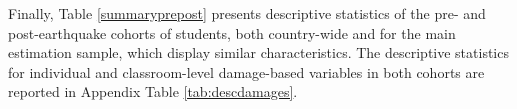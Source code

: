 Finally, Table \ref{summaryprepost} presents descriptive statistics of the pre- and post-earthquake cohorts of students, both country-wide and for the main estimation sample, which display similar characteristics. The descriptive statistics for individual and classroom-level damage-based variables in both cohorts are reported in Appendix Table \ref{tab:descdamages}.\par  







